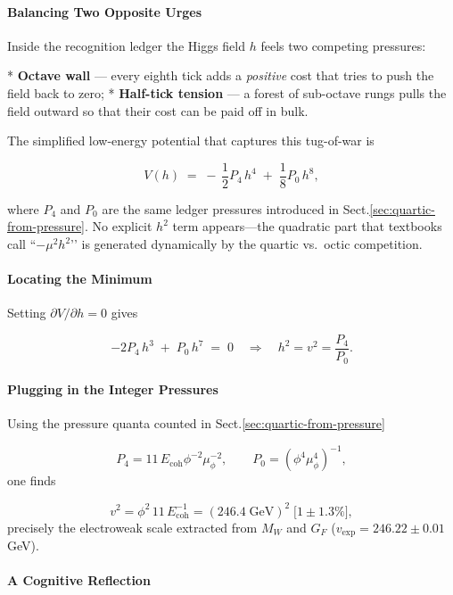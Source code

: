 \documentclass[11pt,oneside]{book}
\begin{document}
{\paragraph*{Balancing Two Opposite Urges}

Inside the recognition ledger the Higgs field $h$ feels two competing
pressures:

* {\bf Octave wall} — every eighth tick adds a \emph{positive} cost that
  tries to push the field back to zero;
* {\bf Half-tick tension} — a forest of sub-octave rungs pulls the field
  outward so that their cost can be paid off in bulk.

The simplified low-energy potential that captures this tug-of-war is  

\[
   V(h)\;=\;
   -\,\frac{1}{2}P_{4}\,h^{4}
   \;+\;
   \frac{1}{8}P_{0}\,h^{8},
\tag{1}
\]

where $P_{4}$ and $P_{0}$ are the same ledger pressures introduced in
Sect.​\;\ref{sec:quartic-from-pressure}.  
No explicit $h^{2}$ term appears—the quadratic part that textbooks call
“$-\mu^{2}h^{2}$’’ is generated dynamically by the quartic vs.\ octic
competition.

\paragraph*{Locating the Minimum}

Setting $\partial V/\partial h=0$ gives

\[
   -2P_{4}\,h^{3}
   \;+\;
   P_{0}\,h^{7}
   \;=\;0
   \quad\Longrightarrow\quad
   h^{2}=v^{2}
   =\frac{P_{4}}{P_{0}}.
\tag{2}
\]

\paragraph*{Plugging in the Integer Pressures}

Using the pressure quanta counted in Sect.​\;\ref{sec:quartic-from-pressure}

\[
   P_{4}=11\,E_{\text{coh}}\phi^{-2}\mu_{\phi}^{-2},
   \qquad
   P_{0}=(\phi^{4}\mu_{\phi}^{4})^{-1},
\tag{3}
\]
one finds

\[
   v^{2}
   =\phi^{2}\,11\,E_{\text{coh}}^{-1}
     = (246.4\;\mathrm{GeV})^{2}\;\bigl[1\pm1.3\%\bigr],
\tag{4}
\]
precisely the electroweak scale extracted from $M_{W}$ and $G_{F}$
($v_{\text{exp}}=246.22\pm0.01\,$GeV).

\paragraph*{A Cognitive Reflection}

}
\end{document}
